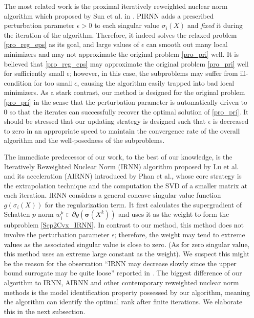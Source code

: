 \documentclass[twoside,11pt]{article}
\numberwithin{equation}{section}
\begin{document}
 
The most related work is the proximal iteratively reweighted nuclear norm algorithm which proposed by Sun {et al.} in \cite{opt_simu_svd_2017}. 
PIRNN adds a prescribed perturbation  parameter $\epsilon>0$ to each singular value $\sigma_{i} (X)$ and \emph{fixed} it during the iteration of the algorithm.
Therefore,  it indeed solves the relaxed problem  \eqref{pro_reg_eps} as its goal, and large values of $\epsilon$ can smooth out many local minimizers  \cite{Zeng_Acc_2022} and may not approximate the original problem \eqref{pro_pri} well.
It is believed that \eqref{pro_reg_eps} may approximate the original problem \eqref{pro_pri} well for sufficiently small $\epsilon$; however, in this case, the subproblems may suffer from ill-condition for too small $\epsilon$, causing the algorithm easily trapped into bad local minimizers. 
As a stark contrast,  our method is designed for the original problem \eqref{pro_pri} in the sense that the perturbation parameter is automatically driven to 0 so that the iterates can successfully recover the optimal solution of \eqref{pro_pri}. 
It should be stressed that our updating strategy is designed such that $\epsilon$ is decreased to zero in an appropriate speed to maintain the convergence rate of the overall algorithm and the well-posedness of the subproblems. 

The immediate predecessor of our work, to the best of our knowledge, is the Iteratively Reweighted Nuclear Norm (IRNN) \cite{ge_nn_LRMM_Canyi_2014} algorithm  proposed by Lu et al.  and its   acceleration (AIRNN) \cite{Alg_conflict_AIRNN_2021}   introduced by Phan {et al.}, whose core strategy is the extrapolation technique and the computation the SVD of a smaller matrix at each iteration.
IRNN considers a general concave singular  value function $g(\sigma_{i}(X))$ for the regularization term. 
It first  calculates the supergradient of Schatten-$p$ norm $w_{i}^{k} \in \partial {g(\bm{\sigma}(X^{k}))}$ and uses it as the weight to form the subproblem  \eqref{Scp2Cvx_IRNN}.  
In contrast to our method,  this method does not involve the perturbation parameter $\epsilon$; therefore, the weight may tend to extreme values as the associated singular value is close to zero. (As for zero singular value, this method uses an extreme large constant as the weight).
We suspect this might be the reason for the observation ``IRNN may decrease slowly since the upper bound surrogate may be quite loose'' reported in \cite{ge_nn_LRMM_Canyi_2014}.  The biggest  difference of our algorithm to IRNN, AIRNN and other contemporary reweighted nuclear norm methods is the model identification property possessed by our algorithm, meaning the algorithm can identify the optimal rank after finite iterations.  We elaborate this in the next subsection.  
\end{document}
